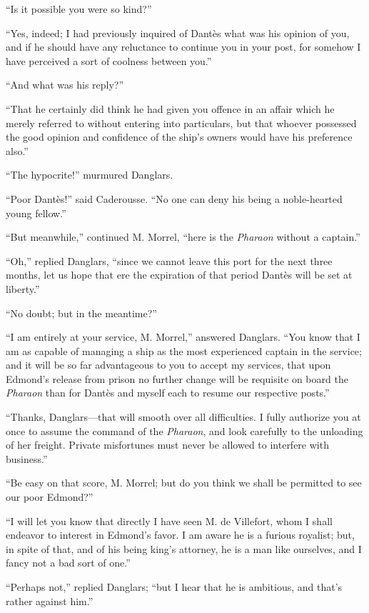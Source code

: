 “Is it possible you were so kind?”

“Yes, indeed; I had previously inquired of Dantès what was his opinion
of you, and if he should have any reluctance to continue you in your
post, for somehow I have perceived a sort of coolness between you.”

“And what was his reply?”

“That he certainly did think he had given you offence in an affair
which he merely referred to without entering into particulars, but that
whoever possessed the good opinion and confidence of the ship’s owners
would have his preference also.”

“The hypocrite!” murmured Danglars.

“Poor Dantès!” said Caderousse. “No one can deny his being a
noble-hearted young fellow.”

“But meanwhile,” continued M. Morrel, “here is the \textit{Pharaon} without a
captain.”

“Oh,” replied Danglars, “since we cannot leave this port for the next
three months, let us hope that ere the expiration of that period Dantès
will be set at liberty.”

“No doubt; but in the meantime?”

“I am entirely at your service, M. Morrel,” answered Danglars. “You
know that I am as capable of managing a ship as the most experienced
captain in the service; and it will be so far advantageous to you to
accept my services, that upon Edmond’s release from prison no further
change will be requisite on board the \textit{Pharaon} than for Dantès and
myself each to resume our respective posts.”

“Thanks, Danglars—that will smooth over all difficulties. I fully
authorize you at once to assume the command of the \textit{Pharaon}, and look
carefully to the unloading of her freight. Private misfortunes must
never be allowed to interfere with business.”

“Be easy on that score, M. Morrel; but do you think we shall be
permitted to see our poor Edmond?”

“I will let you know that directly I have seen M. de Villefort, whom I
shall endeavor to interest in Edmond’s favor. I am aware he is a
furious royalist; but, in spite of that, and of his being king’s
attorney, he is a man like ourselves, and I fancy not a bad sort of
one.”

“Perhaps not,” replied Danglars; “but I hear that he is ambitious, and
that’s rather against him.”

